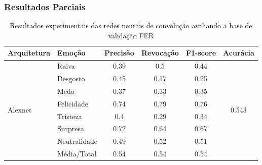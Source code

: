 \documentclass{beamer}
\begin{document}
\begin{frame}
 \frametitle{Resultados Parciais}
 \begin{table}[]
 \tiny
\centering
\caption{Resultados experimentais das redes neurais de convolução avaliando a base de validação FER}
\label{table:fer}
\begin{tabular}{llcccc}
\hline
\textbf{Arquitetura}                   & \textbf{Emoção}       & \multicolumn{1}{l}{\textbf{Precisão}} & \multicolumn{1}{l}{\textbf{Revocação}} & \multicolumn{1}{l}{\textbf{F1-score}} & \multicolumn{1}{l}{\textbf{Acurácia}} \\ \hline
\multirow{8}{*}{Alexnet}         & Raiva                 & 0.39                                  & 0.5                                    & 0.44                                  & \multirow{8}{*}{0.543}                \\
                                       & Desgosto              & 0.45                                  & 0.17                                   & 0.25                                  &                                       \\
                                       & Medo                  & 0.37                                  & 0.33                                   & 0.35                                  &                                       \\
                                       & Felicidade            & 0.74                                  & 0.79                                   & 0.76                                  &                                       \\
                                       & Tristeza              & 0.4                                   & 0.29                                   & 0.34                                  &                                       \\
                                       & Surpresa              & 0.72                                  & 0.64                                   & 0.67                                  &                                       \\
                                       & Neutralidade          & 0.49                                  & 0.52                                   & 0.51                                  &                                       \\
                                       & Média/Total           & 0.54                                  & 0.54                                   & 0.54                                  &                                       \\ \hline

\end{tabular}
\end{table}
\end{frame}
\end{document}
